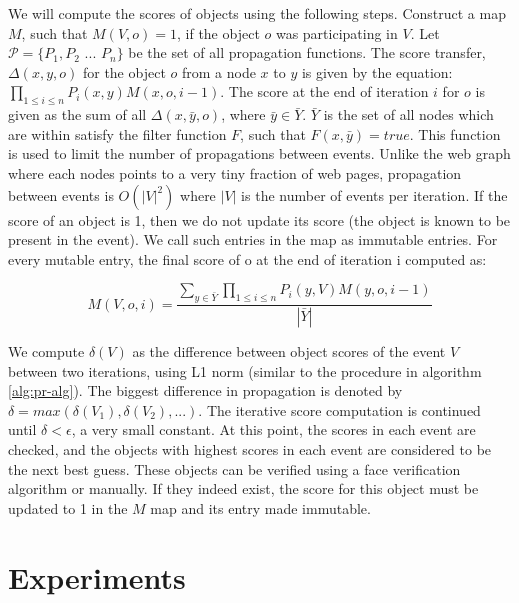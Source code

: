 We will compute the scores of objects using the following steps. Construct a map $M$, such that $M(V, o) = 1$, if the object $o$ was participating in $V$. Let $\mathcal P = \{P_1, P_2 $ ... $ P_n\}$ be the set of all propagation functions. The score transfer, $\Delta(x, y, o)$ for the object $o$ from a node $x$ to $y$ is given by the equation: $\prod_{1 \leq i \leq n} P_i(x, y) M(x, o, i-1)$. The score at the end of iteration $i$ for $o$ is given as the sum of all $\Delta(x, \bar{y}, o)$, where $ \bar{y} \in \bar{Y}$. $\bar{Y}$ is the set of all nodes which are within satisfy the filter function $F$, such that $F(x, \bar{y}) = true$. This function is used to limit the number of propagations between events. Unlike the web graph where each nodes points to a very tiny fraction of web pages, propagation between events is $O(|V|^2)$ where $|V|$ is the number of events per iteration. If the score of an object is 1, then we do not update its score (the object is known to be present in the event). We call such entries in the map as immutable entries. For every mutable entry, the final score of o at the end of iteration i computed as:

\begin{equation}
M(V, o, i) = \frac{\sum_{y \in \bar{Y}} \prod_{1 \leq i \leq n} P_i(y, V) M(y, o, i-1)}{|\bar{Y}|}
\end{equation}

We compute $\delta(V)$ as the difference between object scores of the event $V$ between two iterations, using L1 norm (similar to the procedure in algorithm \ref{alg:pr-alg}). The biggest difference in propagation is denoted by $\delta = max(\delta(V_1), \delta(V_2), ... )$. The iterative score computation is continued until $\delta < \epsilon$, a very small constant. At this point, the scores in each event are checked, and the objects with highest scores in each event are considered to be the next best guess. These objects can be verified using a face verification algorithm or manually. If they indeed exist, the score for this object must be updated to 1 in the $M$ map and its entry made immutable. 

\section{Experiments}

